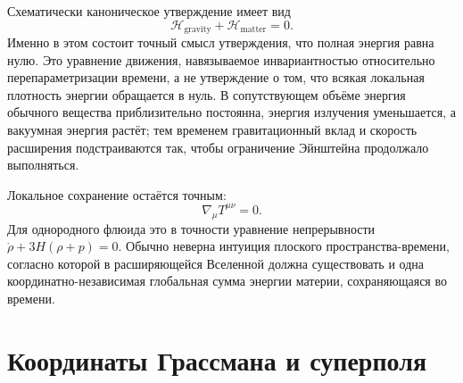 Схематически каноническое утверждение имеет вид
\begin{equation}
\mathcal H_{\mathrm{gravity}}
+\mathcal H_{\mathrm{matter}}
=0.
\end{equation}
Именно в этом состоит точный смысл утверждения, что полная энергия равна нулю. Это уравнение движения, навязываемое инвариантностью относительно перепараметризации времени, а не утверждение о том, что всякая локальная плотность энергии обращается в нуль. В сопутствующем объёме энергия обычного вещества приблизительно постоянна, энергия излучения уменьшается, а вакуумная энергия растёт; тем временем гравитационный вклад и скорость расширения подстраиваются так, чтобы ограничение Эйнштейна продолжало выполняться.

Локальное сохранение остаётся точным:
\begin{equation}
\nabla_\mu T^{\mu\nu}=0.
\end{equation}
Для однородного флюида это в точности уравнение непрерывности \(\dot\rho+3H(\rho+p)=0\). Обычно неверна интуиция плоского пространства-времени, согласно которой в расширяющейся Вселенной должна существовать и одна координатно-независимая глобальная сумма энергии материи, сохраняющаяся во времени.

\begin{classroomqa}
\end{classroomqa}

\section{Координаты Грассмана и суперполя}

\begin{classroomqa}
\end{classroomqa}

